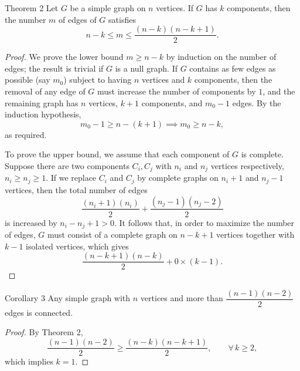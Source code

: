 \begin{thmbox}{Theorem 2}
Let $G$ be a simple graph on $n$ vertices. If $G$ has $k$ components, then the number $m$ of edges of $G$ satisfies
$$n - k \leq m \leq \frac{(n-k)(n-k+1)}{2}.$$
\end{thmbox}

\begin{proof}
We prove the lower bound $m \geq n-k$ by induction on the number of edges; the result is trivial if $G$ is a null graph. If $G$ contains as few edges as possible (say $m_0$) subject to having $n$ vertices and $k$ components, then the removal of any edge of $G$ must increase the number of components by $1$, and the remaining graph has $n$ vertices, $k+1$ components, and $m_0 - 1$ edges. By the induction hypothesis,
$$m_0 - 1 \geq n - (k+1) \implies m_0 \geq n-k,$$
as required.

\medskip
\noindent To prove the upper bound, we assume that each component of $G$ is complete. Suppose there are two components $C_i, C_j$ with $n_i$ and $n_j$ vertices respectively, $n_i \geq n_j \geq 1$. If we replace $C_i$ and $C_j$ by complete graphs on $n_i+1$ and $n_j-1$ vertices, then the total number of edges
$$\frac{(n_i+1)(n_i)}{2} + \frac{(n_j-1)(n_j-2)}{2}$$
is increased by $n_i - n_j + 1 > 0$. It follows that, in order to maximize the number of edges, $G$ must consist of a complete graph on $n-k+1$ vertices together with $k-1$ isolated vertices, which gives
$$\frac{(n-k+1)(n-k)}{2} + 0 \times (k-1).$$
\end{proof}

\begin{thmbox}{Corollary 3}
Any simple graph with $n$ vertices and more than $\dfrac{(n-1)(n-2)}{2}$ edges is connected.
\end{thmbox}

\begin{proof}
By Theorem 2,
$$\frac{(n-1)(n-2)}{2} \geq \frac{(n-k)(n-k+1)}{2}, \qquad \forall\, k \geq 2,$$
which implies $k = 1$.
\end{proof}
